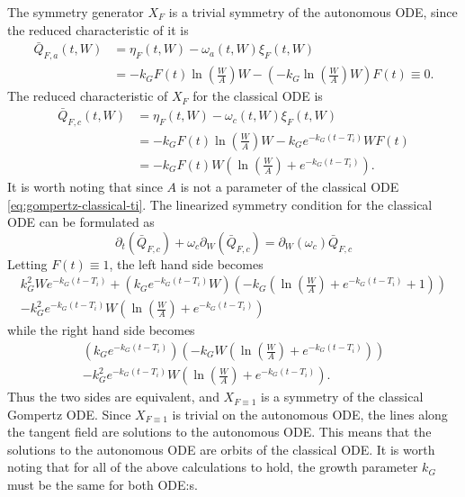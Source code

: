 The symmetry generator \(X_F\) is a trivial symmetry of the autonomous ODE, since the reduced characteristic of it is
\begin{align}
  \bar{Q}_{F,a}(t, W) &= \eta_F(t, W) - \omega_a(t, W) \xi_F(t, W)\\
  &= - k_G F(t) \ln(\frac{W}{A}) W - \left(-k_G \ln(\frac{W}{A}) W \right) F(t) \equiv 0.
\end{align}
The reduced characteristic of \(X_F\) for the classical ODE is
\begin{align}
  \bar{Q}_{F,c}(t, W) &= \eta_F(t, W) - \omega_c(t, W) \xi_F(t, W)\\
  &= - k_G F(t) \ln(\frac{W}{A}) W - k_G e^{-k_G (t - T_i)} W F(t)\\
  &= - k_G F(t) W \left(\ln(\frac{W}{A}) + e^{-k_G (t - T_i)}\right).
\end{align}
It is worth noting that since \(A\) is not a parameter of the classical ODE \ref{eq:gompertz-classical-ti}.
The linearized symmetry condition for the classical ODE can be formulated as
\begin{equation}
  \partial_t(\bar{Q}_{F,c}) + \omega_c \partial_W(\bar{Q}_{F,c}) = \partial_W(\omega_c) \bar{Q}_{F,c}
\end{equation}
Letting \(F(t) \equiv 1\), the left hand side becomes
\begin{gather}
  k_G^2 W e^{-k_G (t - T_i)} + \left(k_G e^{-k_G (t - T_i)} W\right) \left(-k_G \left(\ln(\frac{W}{A}) + e^{-k_G (t - T_i)} + 1\right)\right)\\
  -k_G^2 e^{-k_G (t - T_i)} W\left(\ln(\frac{W}{A}) + e^{-k_G (t - T_i)}\right)
\end{gather}
while the right hand side becomes
\begin{gather}
  \left(k_G e^{-k_G (t - T_i)}\right) \left(- k_G W \left(\ln(\frac{W}{A}) + e^{-k_G (t - T_i)}\right)\right)\\
  -k_G^2 e^{-k_G (t - T_i)} W \left(\ln(\frac{W}{A}) + e^{-k_G (t - T_i)}\right).
\end{gather}
Thus the two sides are equivalent, and \(X_{F\equiv1}\) is a symmetry of the classical Gompertz ODE.
Since \(X_{F\equiv1}\) is trivial on the autonomous ODE, the lines along the tangent field are solutions to the autonomous ODE.
This means that the solutions to the autonomous ODE are orbits of the classical ODE.
It is worth noting that for all of the above calculations to hold, the growth parameter \(k_G\) must be the same for both ODE:s.
